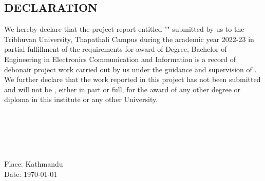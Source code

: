 \begin{titlepage}

	\chapter*{DECLARATION}
	\thispagestyle{empty}
	
	\noindent We hereby declare that the project report entitled "{\textbf{\cTitle}}" submitted by us to the Tribhuvan University, Thapathali Campus during the academic year 2022-23 in partial fulfillment of the requirements for  award of Degree, Bachelor of Engineering in Electronics Communication and Information  is a record of debonair project work carried out by us under the guidance and supervision of . We further declare that the work reported in this project has not been submitted and will not be , either in part or  full, for the award of any other degree or diploma in this institute or any other University.
	
	\vspace{2cm}
	
	\begin{flushright}
		\textbf{\MakeUppercase{\cSubmittedI}} \\		\textbf{\MakeUppercase{\cSubmittedII}} \\		\textbf{\MakeUppercase{\cSubmittedIII}} \\		\textbf{\MakeUppercase{\cSubmittedIV}} \\
	\end{flushright}
	
	\noindent Place: Kathmandu \\
	Date: \today
	
\end{titlepage}